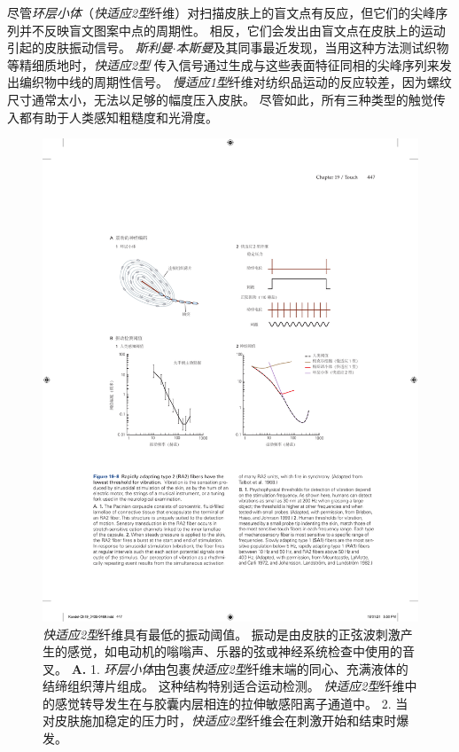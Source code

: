 尽管\textit{环层小体}（\textit{快适应2型}纤维）对扫描皮肤上的盲文点有反应，但它们的尖峰序列并不反映盲文图案中点的周期性。
相反，它们会发出由盲文点在皮肤上的运动引起的皮肤振动信号。
\textit{斯利曼$\cdot$本斯曼}及其同事最近发现，当用这种方法测试织物等精细质地时，\textit{快适应2型} 传入信号通过生成与这些表面特征同相的尖峰序列来发出编织物中线的周期性信号。
\textit{慢适应1型}纤维对纺织品运动的反应较差，因为螺纹尺寸通常太小，无法以足够的幅度压入皮肤。
尽管如此，所有三种类型的触觉传入都有助于人类感知粗糙度和光滑度。


\begin{figure}[htbp]
	\centering
	\includegraphics[width=1.0\linewidth]{chap19/fig_19_8}
	\caption{\textit{快适应2型}纤维具有最低的振动阈值。
		振动是由皮肤的正弦波刺激产生的感觉，如电动机的嗡嗡声、乐器的弦或神经系统检查中使用的音叉。
		\textbf{A.} 1. \textit{环层小体}由包裹\textit{快适应2型}纤维末端的同心、充满液体的结缔组织薄片组成。 这种结构特别适合运动检测。
		\textit{快适应2型}纤维中的感觉转导发生在与胶囊内层相连的拉伸敏感阳离子通道中。
		2. 当对皮肤施加稳定的压力时，\textit{快适应2型}纤维会在刺激开始和结束时爆发。
}
\end{figure}
